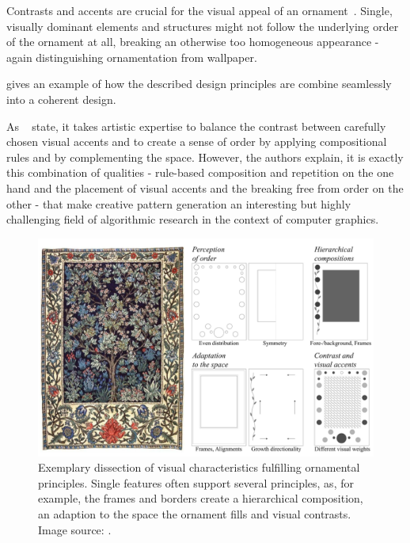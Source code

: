 Contrasts and accents are crucial for the visual appeal of an ornament~\cite{wong_1998_cgf,ward_1896_tpo, moughtin_1999_udo}. Single, visually dominant elements and structures might not follow the underlying order of the ornament at all, breaking an otherwise too homogeneous appearance - again distinguishing ornamentation from wallpaper.

 gives an example of how the described design principles are combine seamlessly into a coherent design.

As \citeauthor*{gieseke_2017_ooo}~\cite{gieseke_2017_ooo} state, it takes artistic expertise to balance the contrast between carefully chosen visual accents and to create a sense of order by applying compositional rules and by complementing the space. However, the authors explain, it is exactly this combination of qualities - rule-based composition and repetition on the one hand and the placement of visual accents and the breaking free from order on the other - that make creative pattern generation an interesting but highly challenging field of algorithmic research in the context of computer graphics.


\begin{figure}
       \includegraphics[width=1\columnwidth]{figures/ornament/ornament_principles.pdf}
        \caption[Ornamentation principles]{\label{fig:ornamentation_principles} Exemplary dissection of visual characteristics fulfilling ornamental principles. Single features often support several principles, as, for example, the frames and borders create a hierarchical composition, an adaption to the space the ornament fills and visual contrasts. Image source: \cite{morris_1910_tol}.}
\end{figure}

